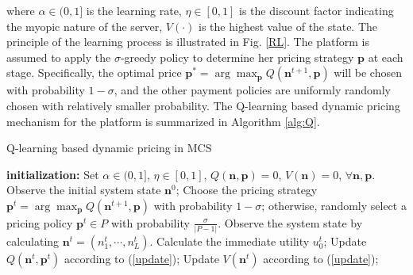 where $\alpha\in(0,1]$ is the learning rate, $\eta\in[0,1]$ is the discount factor indicating the myopic nature of the server, $V(\cdot)$ is the highest value of the state. The principle of the learning process is illustrated in Fig. \ref{RL}. The platform is assumed to apply the $\sigma$-greedy policy to determine her pricing strategy $\mathbf{p}$ at each stage. Specifically, the optimal price $\mathbf{p^*}=\arg\max_{\mathbf{p}}Q(\mathbf{n}^{t+1},\mathbf{p})$ will be chosen with probability $1-\sigma$, and the other payment policies are uniformly randomly chosen with relatively smaller probability. The Q-learning based dynamic pricing mechanism for the platform is summarized in Algorithm \ref{alg:Q}.

\begin{algorithm}
\caption{Q-learning based dynamic pricing in MCS}
\label{alg:Q}
\begin{algorithmic}[1]
\STATE \textbf{initialization:}
\STATE Set $\alpha\in(0,1]$, $\eta\in[0,1]$, $Q(\mathbf{n},\mathbf{p})=0$, $V(\mathbf{n})=0$, $\forall\mathbf{n}, \mathbf{p}$.
\STATE Observe the initial system state $\mathbf{n}^0$;
\STATE Choose the pricing strategy $\mathbf{p}^t=\arg\max_{\mathbf{p}}Q(\mathbf{n}^{t+1},\mathbf{p})$ with probability $1-\sigma$; otherwise, randomly select a pricing policy $\mathbf{p}^t\in P$ with probability $\frac{\sigma}{|P-1|}$.
\STATE Observe the system state by calculating $\mathbf{n}^t=(n^t_1,\cdots, n^t_L)$.
\STATE Calculate the immediate utility $u^t_0$;
\STATE Update $Q(\mathbf{n}^t, \mathbf{p}^t)$ according to (\ref{update});
\STATE Update $V(\mathbf{n}^t)$ according to (\ref{update});
\ENDFOR
\end{algorithmic}
\end{algorithm}


